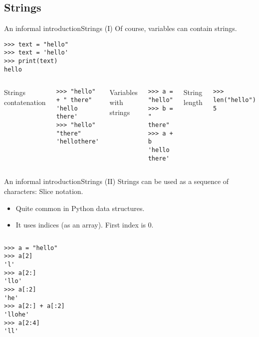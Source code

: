 \documentclass[10pt,compress]{beamer} %
\begin{document}
\subsection{Strings}

\begin{frame}[fragile]{An informal introduction}{Strings (I)}
	Of course, variables can contain strings.
	\begin{block}{}
		\begin{verbatim}
>>> text = "hello"
>>> text = 'hello'
>>> print(text)
hello
\end{verbatim}
	\end{block}

	\begin{columns}
		Strings contatenation
				\begin{block}{}
				\begin{verbatim}
>>> "hello" + " there"
'hello there'
>>> "hello" "there"
'hellothere'
\end{verbatim}
				\end{block}

		Variables with strings
				\begin{block}{}
				\begin{verbatim}
>>> a = "hello"
>>> b = " there"
>>> a + b
'hello there'
\end{verbatim}
				\end{block}

		String length
				\begin{block}{}
				\begin{verbatim}
>>> len("hello")
5
\end{verbatim}
				\end{block}
		\end{columns}

\end{frame}

\begin{frame}[fragile]{An informal introduction}{Strings (II)}
	\vspace{-0.2cm}
	Strings can be used as a sequence of characters: \alert{Slice notation}.
	\begin{itemize}
	\item Quite common in Python data structures.
	\item It uses indices (as an array). First index is $0$.
	\end{itemize}
	\vspace{-0.3cm}
	\begin{columns}
 	   			\column{.40\textwidth}
				\begin{block}{}
				\begin{verbatim}
>>> a = "hello"
>>> a[2]
'l'
>>> a[2:]
'llo'
>>> a[:2]
'he'
>>> a[2:] + a[:2]
'llohe'
>>> a[2:4]
'll'
\end{verbatim}
				\end{block}
		\end{columns}
\end{frame}
\end{document}
